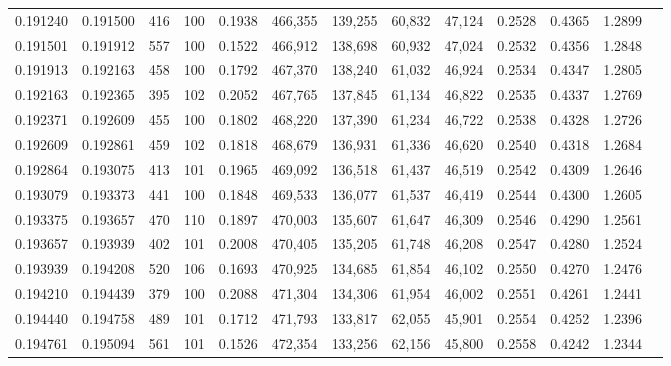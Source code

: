 \begin{tabular}{rrrrrrrrrrrrr}
0.191240 & 0.191500 &   416 & 100 &                                     0.1938 & 466,355 & 139,255 &  60,832 &  47,124 & 0.2528 & 0.4365 & 1.2899 \\
0.191501 & 0.191912 &   557 & 100 &                                     0.1522 & 466,912 & 138,698 &  60,932 &  47,024 & 0.2532 & 0.4356 & 1.2848 \\
0.191913 & 0.192163 &   458 & 100 &                                     0.1792 & 467,370 & 138,240 &  61,032 &  46,924 & 0.2534 & 0.4347 & 1.2805 \\
0.192163 & 0.192365 &   395 & 102 &                                     0.2052 & 467,765 & 137,845 &  61,134 &  46,822 & 0.2535 & 0.4337 & 1.2769 \\
0.192371 & 0.192609 &   455 & 100 &                                     0.1802 & 468,220 & 137,390 &  61,234 &  46,722 & 0.2538 & 0.4328 & 1.2726 \\
0.192609 & 0.192861 &   459 & 102 &                                     0.1818 & 468,679 & 136,931 &  61,336 &  46,620 & 0.2540 & 0.4318 & 1.2684 \\
0.192864 & 0.193075 &   413 & 101 &                                     0.1965 & 469,092 & 136,518 &  61,437 &  46,519 & 0.2542 & 0.4309 & 1.2646 \\
0.193079 & 0.193373 &   441 & 100 &                                     0.1848 & 469,533 & 136,077 &  61,537 &  46,419 & 0.2544 & 0.4300 & 1.2605 \\
0.193375 & 0.193657 &   470 & 110 &                                     0.1897 & 470,003 & 135,607 &  61,647 &  46,309 & 0.2546 & 0.4290 & 1.2561 \\
0.193657 & 0.193939 &   402 & 101 &                                     0.2008 & 470,405 & 135,205 &  61,748 &  46,208 & 0.2547 & 0.4280 & 1.2524 \\
0.193939 & 0.194208 &   520 & 106 &                                     0.1693 & 470,925 & 134,685 &  61,854 &  46,102 & 0.2550 & 0.4270 & 1.2476 \\
0.194210 & 0.194439 &   379 & 100 &                                     0.2088 & 471,304 & 134,306 &  61,954 &  46,002 & 0.2551 & 0.4261 & 1.2441 \\
0.194440 & 0.194758 &   489 & 101 &                                     0.1712 & 471,793 & 133,817 &  62,055 &  45,901 & 0.2554 & 0.4252 & 1.2396 \\
0.194761 & 0.195094 &   561 & 101 &                                     0.1526 & 472,354 & 133,256 &  62,156 &  45,800 & 0.2558 & 0.4242 & 1.2344 \\

\end{tabular}
